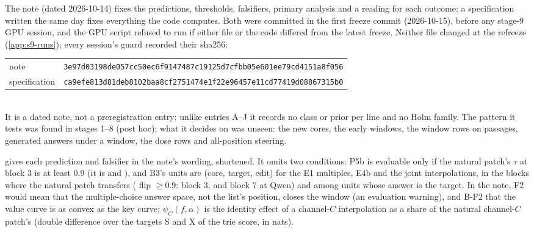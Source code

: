 The note (dated 2026-10-14) fixes the predictions, thresholds, falsifiers, primary analysis and a reading for each outcome; a specification written the same day fixes everything the code computes. Both were committed in the first freeze commit (2026-10-15), before any stage-9 GPU session, and the GPU script refused to run if either file or the code differed from the latest freeze. Neither file changed at the refreeze (\cref{app:s9-runs}); every session's guard recorded their sha256:\\[2pt]
{\small\begin{tabular}{@{}ll@{}}
note & \texttt{3e97d03198de057cc50ec6f9147487c19125d7cfbb05e601ee79cd4151a8f056}\\
specification & \texttt{ca9efe813d81deb8102baa8cf2751474e1f22e96457e11cd77419d08867315b0}
\end{tabular}}\\[2pt]
It is a dated note, not a preregistration entry: unlike entries A--J it records no class or prior per line and no Holm family. The pattern it tests was found in stages 1--8 (post hoc); what it decides on was unseen: the new cores, the early windows, the window rows on passages, generated answers under a window, the dose rows and all-position steering.

 gives each prediction and falsifier in the note's wording, shortened. It omits two conditions: P5b is evaluable only if the natural patch's $\tau$ at block 3 is at least 0.9 (it is \NqTauNatThreeMistralSeven{} and \NqTauNatThreeQwenSeven{}), and B3's units are (core, target, edit) for the E1 multiples, E4b and the joint interpolations, in the blocks where the natural patch transfers (\fmtListA{} flip $\geq 0.9$: block 3, and block 7 at Qwen) and among units whose \fmtNone{} answer is the target. In the note, F2 would mean that the multiple-choice answer space, not the list's position, closes the window (an evaluation warning), and B-F2 that the value curve is as convex as the key curve; $\psi_C(f, \alpha)$ is the identity effect of a channel-$C$ interpolation as a share of the natural channel-$C$ patch's (double difference over the targets S and X of the trie score, in nats).

